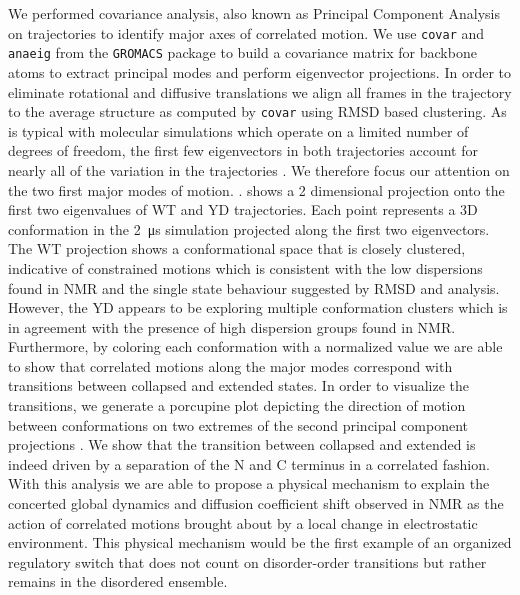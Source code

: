 We performed covariance analysis, also known as Principal Component Analysis on \gct trajectories to identify major axes of correlated motion. We use \texttt{covar} and \texttt{anaeig} from the \texttt{GROMACS} package to build a covariance matrix for backbone atoms to extract principal modes and perform eigenvector projections. In order to eliminate rotational and diffusive  translations we align all frames in the trajectory to the average structure as computed by \texttt{covar} using RMSD based clustering. As is typical with molecular simulations which operate on a limited number of degrees of freedom, the first few eigenvectors in both trajectories account for nearly all of the variation in the trajectories . We therefore focus our attention on the two first major modes of motion. .  shows a 2 dimensional projection onto the first two eigenvalues of WT and YD trajectories. Each point represents a 3D conformation in the \SI{2}{\us} simulation projected along the first two eigenvectors. The WT projection shows a conformational space that is closely clustered, indicative of constrained motions which is consistent with the low dispersions found in NMR and the single state behaviour suggested by RMSD and \diffusion analysis. However, the YD appears to be exploring  multiple conformation clusters which is in agreement with the presence of high dispersion groups found in NMR. Furthermore, by coloring each conformation with a normalized \diffusion value we are able to show that correlated motions along the major modes correspond with transitions between collapsed and extended states. In order to visualize the transitions, we generate a porcupine plot depicting the direction of motion between conformations on two extremes of the second principal component projections .  We show that the transition between collapsed and extended is indeed driven by a separation of the N and C terminus in a correlated fashion.  With this analysis we are able to propose a physical mechanism to explain the concerted global dynamics and diffusion coefficient shift observed in NMR as the action of correlated motions brought about by a local change in electrostatic environment. This physical mechanism would be the first example of an organized regulatory switch that does not count on disorder-order transitions but rather remains in the disordered ensemble. 





